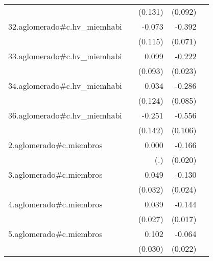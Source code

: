 {\begin{longtable}{l*{4}{D{.}{.}{-1}}}
            &                     &     (0.131)         &     (0.092)         &                     \\
\addlinespace
32.aglomerado#c.hv\_miemhabi&                     &      -0.073         &      -0.392\sym{***}&                     \\
            &                     &     (0.115)         &     (0.071)         &                     \\
\addlinespace
33.aglomerado#c.hv\_miemhabi&                     &       0.099         &      -0.222\sym{***}&                     \\
            &                     &     (0.093)         &     (0.023)         &                     \\
\addlinespace
34.aglomerado#c.hv\_miemhabi&                     &       0.034         &      -0.286\sym{***}&                     \\
            &                     &     (0.124)         &     (0.085)         &                     \\
\addlinespace
36.aglomerado#c.hv\_miemhabi&                     &      -0.251         &      -0.556\sym{***}&                     \\
            &                     &     (0.142)         &     (0.106)         &                     \\
\addlinespace
2.aglomerado#c.miembros&                     &       0.000         &      -0.166\sym{***}&                     \\
            &                     &         (.)         &     (0.020)         &                     \\
\addlinespace
3.aglomerado#c.miembros&                     &       0.049         &      -0.130\sym{***}&                     \\
            &                     &     (0.032)         &     (0.024)         &                     \\
\addlinespace
4.aglomerado#c.miembros&                     &       0.039         &      -0.144\sym{***}&                     \\
            &                     &     (0.027)         &     (0.017)         &                     \\
\addlinespace
5.aglomerado#c.miembros&                     &       0.102\sym{***}&      -0.064\sym{**} &                     \\
            &                     &     (0.030)         &     (0.022)         &                     \\

\end{longtable}}
